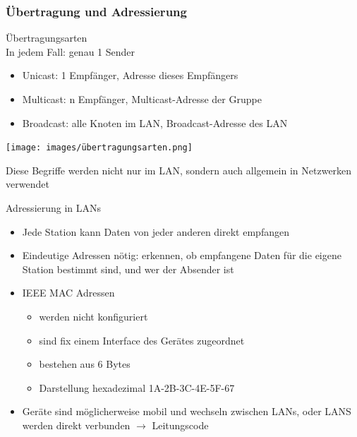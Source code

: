 \subsubsection{Übertragung und Adressierung}

\begin{definition}{Übertragungsarten}\\
    In jedem Fall: genau 1 Sender
    \begin{itemize}
        \item Unicast: 1 Empfänger, Adresse dieses Empfängers
        \item Multicast: n Empfänger, Multicast-Adresse der Gruppe
        \item Broadcast: alle Knoten im LAN, Broadcast-Adresse des LAN
    \end{itemize}
    \begin{minipage}{0.35\linewidth}
        \texttt{[image: images/übertragungsarten.png]}
    \end{minipage}
    \begin{minipage}{0.6\linewidth}
        Diese Begriffe werden nicht nur im LAN, sondern auch allgemein in Netzwerken verwendet
    \end{minipage}
\end{definition}

\begin{concept}{Adressierung in LANs}
    \begin{itemize}
        \item Jede Station kann Daten von jeder anderen direkt empfangen
        \item Eindeutige Adressen nötig:  erkennen, ob empfangene Daten für die eigene Station bestimmt sind, und wer der Absender ist
        \item IEEE MAC Adressen
        \begin{itemize}
            \item werden nicht konfiguriert
            \item sind fix einem Interface des Gerätes zugeordnet
            \item bestehen aus 6 Bytes
            \item Darstellung hexadezimal 1A-2B-3C-4E-5F-67
        \end{itemize}
        \item Geräte sind möglicherweise mobil und wechseln zwischen LANs, oder LANS werden direkt verbunden $\longrightarrow$ Leitungscode
    \end{itemize}
\end{concept}



